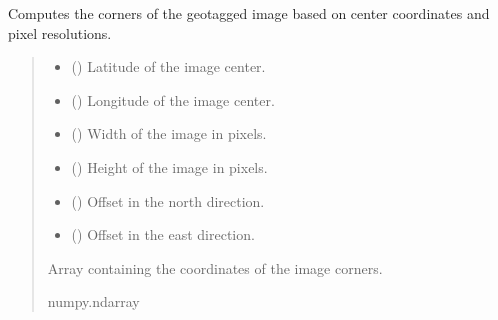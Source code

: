 \documentclass[letterpaper,10pt,english]{sphinxmanual}
\begin{document}
\begin{fulllineitems}
\label{\detokenize{index:georef.Geotagger.output_corners}}
\pysigstartsignatures
{}
\pysigstopsignatures
\sphinxAtStartPar
Computes the corners of the geotagged image based on center coordinates and pixel resolutions.
\begin{quote}\begin{description}
\begin{itemize}
\item {} 
\sphinxAtStartPar
{} () \textendash{} Latitude of the image center.

\item {} 
\sphinxAtStartPar
{} () \textendash{} Longitude of the image center.

\item {} 
\sphinxAtStartPar
{} () \textendash{} Width of the image in pixels.

\item {} 
\sphinxAtStartPar
{} () \textendash{} Height of the image in pixels.

\item {} 
\sphinxAtStartPar
{} () \textendash{} Offset in the north direction.

\item {} 
\sphinxAtStartPar
{} () \textendash{} Offset in the east direction.

\end{itemize}

\sphinxAtStartPar
Array containing the coordinates of the image corners.

\sphinxAtStartPar
numpy.ndarray

\end{description}\end{quote}

\end{fulllineitems}
\end{document}
